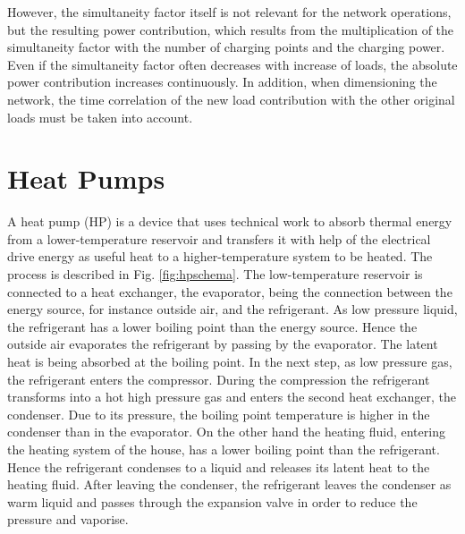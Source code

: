 However, the simultaneity factor itself is not relevant for the network operations, but the resulting power contribution, which results from the multiplication of the simultaneity factor with the number of charging points and the charging power. Even if the simultaneity factor often decreases with increase of loads, the absolute power contribution increases continuously. In addition, when dimensioning the network, the time correlation of the new load contribution with the other original loads must be taken into account.

\section{Heat Pumps}

A heat pump (HP) is a device that uses technical work to absorb thermal energy from a lower-temperature reservoir and transfers it with help of the electrical drive energy as useful heat to a higher-temperature system to be heated. The process is described in Fig. \ref{fig:hpschema}. The low-temperature reservoir is connected to a heat exchanger, the evaporator, being the connection between the energy source, for instance outside air, and the refrigerant. As low pressure liquid, the refrigerant has a lower boiling point than the energy source. %
Hence the outside air evaporates the refrigerant by passing by the evaporator. The latent heat is being absorbed at the boiling point. In the next step, as low pressure gas, the refrigerant enters the compressor. During the compression the refrigerant transforms into a hot high pressure gas and enters the second heat exchanger, the condenser. Due to its pressure, the boiling point temperature is higher in the condenser than in the evaporator. On the other hand the heating fluid, entering the heating system of the house, has a lower boiling point than the refrigerant. Hence the refrigerant condenses to a liquid and releases its latent heat to the heating fluid. After leaving the condenser, the refrigerant leaves the condenser as warm liquid and passes through the expansion valve in order to reduce the pressure and vaporise.~\cite{DINCER2015131}

